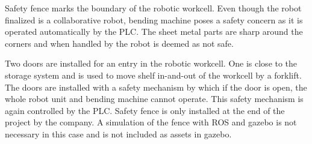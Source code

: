 Safety fence marks the boundary of the robotic workcell. Even though the robot finalized is a collaborative robot,
bending machine poses a safety concern as it is operated automatically by the PLC. The sheet metal parts are sharp
around the corners and when handled by the robot is deemed as not safe.

Two doors are installed for an entry in the robotic workcell. One is close to the storage system and is used
to move shelf in-and-out of the workcell by a forklift. The doors are installed with a safety mechanism by which
if the door is open, the whole robot unit and bending machine cannot operate. This safety mechanism 
is again controlled by the PLC. Safety fence is only installed at the end of the project by the company.
A simulation of the fence with ROS and gazebo is not necessary in this case and is not included as assets in gazebo.
